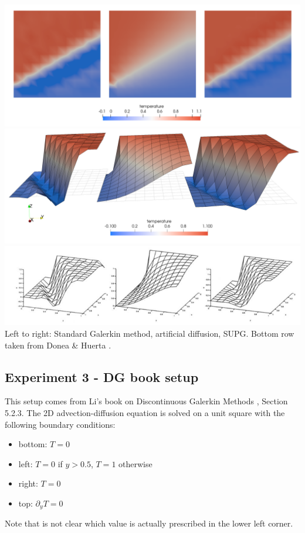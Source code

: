 \begin{center}
\includegraphics[width=15cm]{python_codes/fieldstone_65/results/exp2/Temps2}\\
\includegraphics[width=15cm]{python_codes/fieldstone_65/results/exp2/Temps}\\
\includegraphics[width=15cm]{python_codes/fieldstone_65/images/exp2}\\
{\captionfont Left to right: Standard Galerkin method, artificial diffusion, SUPG. 
Bottom row taken from Donea \& Huerta \cite{dohu03}. }
\end{center}



\subsection*{Experiment 3 - DG book setup}

This setup comes from Li's book on Discontinuous Galerkin Methods \cite{li06}, Section 5.2.3.
The 2D advection-diffusion equation is solved on a unit square with the following boundary 
conditions:
\begin{itemize}
\item bottom: $T=0$
\item left: $T=0$ if $y>0.5$, $T=1$ otherwise
\item right: $T=0$
\item top: $\partial_y T=0$
\end{itemize} 
Note that is not clear which value is actually prescribed in the lower left corner. 

